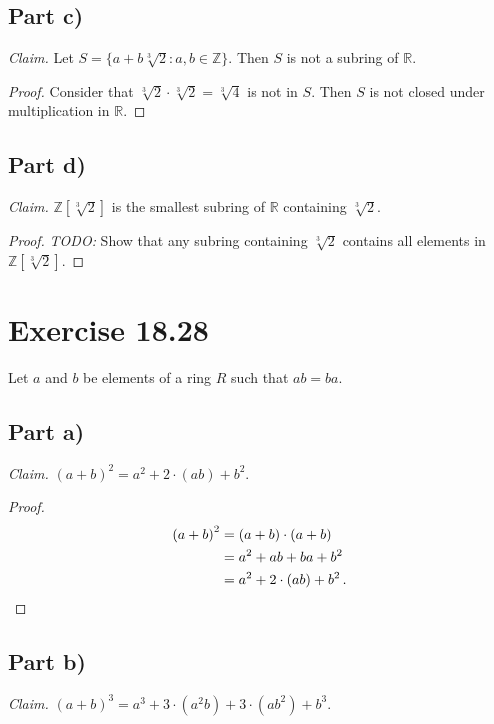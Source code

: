 \documentclass{abrice}
\newcommand{\Z}{\mathbb{Z}}
\newcommand{\R}{\mathbb{R}}
\begin{document}
\subsection{Part c)}

\emph{Claim.} Let $S = \{a + b\sqrt[3]{2} : a,b \in \Z \}$. Then $S$ is not a
subring of $\R$.

\begin{proof}
  Consider that $\sqrt[3]{2} \cdot \sqrt[3]{2} = \sqrt[3]{4}$ is not in $S$.
  Then $S$ is not closed under multiplication in $\R$.
\end{proof}

\subsection{Part d)}

\emph{Claim.} $\Z[\sqrt[3]{2}]$ is the smallest subring of $\R$ containing
$\sqrt[3]{2}$.

\begin{proof}
  \emph{TODO:} Show that any subring containing $\sqrt[3]{2}$ contains all
  elements in $\Z[\sqrt[3]{2}]$.
\end{proof}

\section{Exercise 18.28}

Let $a$ and $b$ be elements of a ring $R$ such that $ab = ba$.

\subsection{Part a)}

\emph{Claim.} ${(a + b)}^2 = a^2 + 2 \cdot (ab) + b^2$.

\begin{proof}
  \begin{align*}
    {(a + b)}^2
    &= (a + b) \cdot (a + b) \\
    &= a^2 + ab + ba + b^2 \\
    &= a^2 + 2 \cdot (ab) + b^2\, . \qedhere
  \end{align*}
\end{proof}

\subsection{Part b)}

\emph{Claim.} ${(a + b)}^3 = a^3 + 3 \cdot (a^2b) + 3 \cdot (ab^2) + b^3$.
\end{document}
